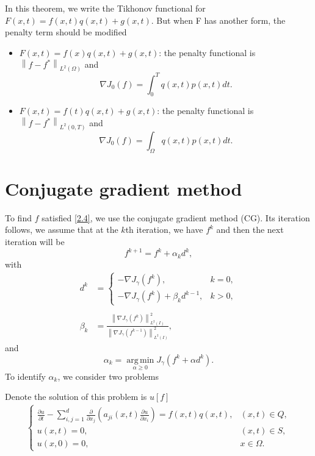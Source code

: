 \documentclass[]{article}
\begin{document}
\begin{cy}
	In this theorem, we write the Tikhonov functional for $F(x, t)=f(x, t)q(x, t)+g(x, t)$. But when F has another form, the penalty term should be modified
	\begin{itemize}
		\item $F(x, t)=f(x)q(x, t)+g(x, t)$: the penalty functional is $\left\|f-f^*\right\|_{L^2(\Omega)}$ and $$\nabla J_0(f)=\int_0^Tq(x, t)p(x, t)dt.$$
		\item $F(x, t)=f(t)q(x, t)+g(x, t)$: the penalty functional is $\left\|f-f^*\right\|_{L^2(0, T)}$ and $$\nabla J_0(f)=\int_\Omega q(x, t)p(x, t)dt.$$
	\end{itemize}
\end{cy}

\section{Conjugate gradient method}\label{section3}
\noindent To find $f$ satisfied \eqref{2.4}, we use the conjugate gradient method (CG). Its iteration follows, we assume that at the $k$th iteration, we have $f^k$ and then the next iteration will be
$$f^{k+1}=f^k+\alpha_kd^k,$$
with
\begin{align*}
	d^k&=\left\{\begin{array}{ll}
	-\nabla J_\gamma(f^k),& k=0,\\
	-\nabla J_\gamma(f^k)+\beta_kd^{k-1},& k>0,
	\end{array}\right.\\\\
	\beta_k&=\frac{\left\|\nabla J_\gamma (f^k)\right\|^2_{L^2(I)}}{\left\|\nabla J_\gamma (f^{k-1})\right\|^2_{L^2(I)}},
\end{align*}
and
$$\alpha_k=\operatorname*{arg\,min}_{\alpha\geq 0}J_\gamma(f^k+\alpha d^k).$$
To identify $\alpha_k$, we consider two problems
\begin{bt}\label{bt2.1}
	Denote the solution of this problem is $u[f]$
	\begin{align*}
		\begin{cases}
			\frac{\partial u}{\partial t}-\sum_{i, j=1}^{d}\frac{\partial}{\partial x_j}\left(a_{ji}(x, t)\frac{\partial u}{\partial x_i}\right)=f(x, t)q(x, t),&(x, t)\in Q,\\
			u(x, t)=0, & (x, t)\in S,\\
			u(x, 0)=0,&x\in \Omega.
		\end{cases}
	\end{align*}
\end{bt}
\end{document}
